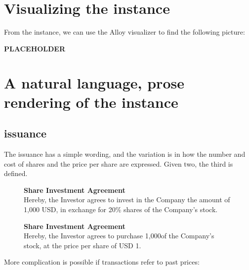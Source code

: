 \section{Visualizing the instance}

From the instance, we can use the Alloy visualizer to find the following picture:

\textbf{{PLACEHOLDER}}

\section{A natural language, prose rendering of the instance}

\subsection{issuance}

The issuance has a simple wording, and the variation is in how the number and cost of shares and the price per share are expressed. Given two, the third is defined.

\begin{multicols}{2}
	\begin{figure}[H]\label{fig:doc-tt-issuance}
		\centering
		\begin{minipage}{0.4\textwidth}
			\textbf{Share Investment Agreement}
			\\
			Hereby, the Investor agrees to invest in the Company the amount of 1,000 USD, in exchange for 20\% shares of the Company's stock.
		\end{minipage}
	\end{figure}
	\columnbreak{}
	\begin{figure}[H]\label{fig:doc-tt-issuance-2}
		\centering
		\begin{minipage}{0.4\textwidth}
			\textbf{Share Investment Agreement}
			\\ \@
			Hereby, the Investor agrees to purchase 1,000\@shares of the Company's stock, at the price per share of USD 1.
		\end{minipage}
	\end{figure}
\end{multicols}

More complication is possible if \glspl{transaction} refer to past prices:

